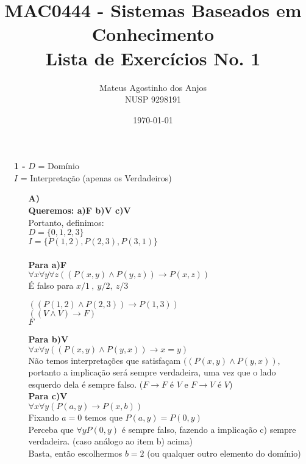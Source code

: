 \documentclass[12pt]{article}
\title{MAC0444 - Sistemas Baseados em Conhecimento \\
Lista de Exercícios No. 1
}
\author{Mateus Agostinho dos Anjos\\NUSP 9298191}
\date{\today}
\begin{document}
	\maketitle
	\begin{itemize}
		\item[\textbf{1 -}]
			\hfill\newline
			$D$ = Domínio\\
			$I$ = Interpretação (apenas os Verdadeiros)\\
			\begin{itemize}
				\item[\textbf{A)}]
					\hfill\\
					\textbf{Queremos: a)F b)V c)V}\\
					Portanto, definimos:\\
					$D = \lbrace 0, 1, 2, 3 \rbrace$\\
					$I = \lbrace P(1, 2), P(2, 3), P(3, 1) \rbrace$\\ \\
					\textbf{Para a)F}\\
					$\forall x \forall y \forall z ((P(x,y) \wedge P(y,z)) \rightarrow P(x, z))$\\
					É falso para $x/1 \ , \ y/2, \ z/3$\\
					\begin{center}	
						$((P(1,2) \wedge P(2,3)) \rightarrow P(1, 3))$\\
						$((V \wedge V) \rightarrow F)$\\
						$F$
					\end{center}
					\textbf{Para b)V}\\
					$\forall x \forall y ((P(x,y) \wedge P(y,x)) \rightarrow x = y)$\\
					Não temos interpretações que satisfaçam $((P(x,y) \wedge P(y,x))$, portanto
					a implicação será sempre verdadeira, uma vez que o lado esquerdo dela é
					sempre falso. ($F \rightarrow F$ é $V$ e $F \rightarrow V$ é $V$)\\
					
					\textbf{Para c)V}\\
					$\forall x \forall y (P(a,y) \rightarrow P(x, b))$\\
					Fixando $a = 0$ temos que $P(a, y) = P(0, y)$\\
					Perceba que $\forall y P(0, y)$ é sempre falso, fazendo a implicação c)
					sempre verdadeira. (caso análogo ao item b) acima)\\
					Basta, então escolhermos $b = 2$ (ou qualquer outro elemento do domínio)
					

\end{itemize}
\end{itemize}
\end{document}
